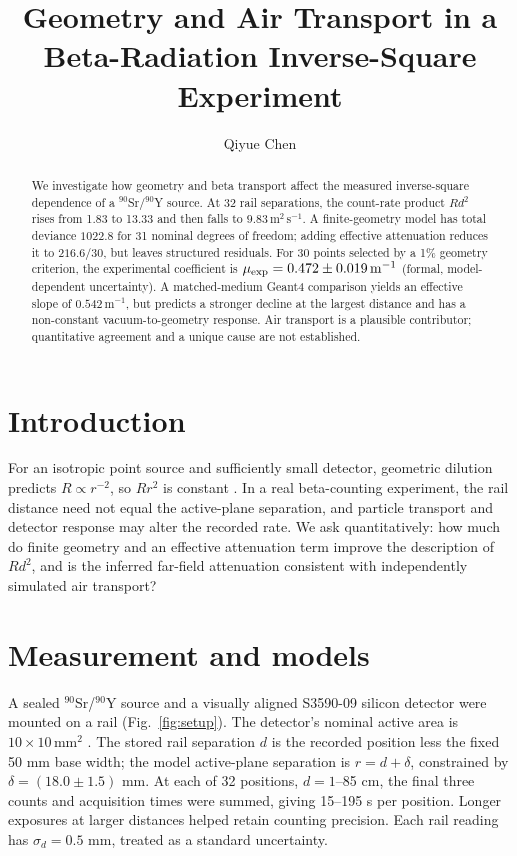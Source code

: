 \documentclass[journal,a4paper]{Imperial_lab_report}
\begin{document}
\title{Geometry and Air Transport in a Beta-Radiation Inverse-Square Experiment}
\author{Qiyue Chen}
\maketitle
\begin{abstract}
We investigate how geometry and beta transport affect the measured inverse-square dependence of a $^{90}$Sr/$^{90}$Y source. At 32 rail separations, the count-rate product $Rd^2$ rises from 1.83 to 13.33 and then falls to $9.83\,\mathrm{m^2\,s^{-1}}$. A finite-geometry model has total deviance $1022.8$ for 31 nominal degrees of freedom; adding effective attenuation reduces it to $216.6/30$, but leaves structured residuals. For 30 points selected by a 1\% geometry criterion, the experimental coefficient is $\mu_{\rm exp}=0.472\pm0.019\,\mathrm{m^{-1}}$ (formal, model-dependent uncertainty). A matched-medium Geant4 comparison yields an effective slope of $0.542\,\mathrm{m^{-1}}$, but predicts a stronger decline at the largest distance and has a non-constant vacuum-to-geometry response. Air transport is a plausible contributor; quantitative agreement and a unique cause are not established.
\end{abstract}

\section{Introduction}
For an isotropic point source and sufficiently small detector, geometric dilution predicts $R\propto r^{-2}$, so $Rr^2$ is constant \cite{script}. In a real beta-counting experiment, the rail distance need not equal the active-plane separation, and particle transport and detector response may alter the recorded rate. We ask quantitatively: how much do finite geometry and an effective attenuation term improve the description of $Rd^2$, and is the inferred far-field attenuation consistent with independently simulated air transport?

\section{Measurement and models}
A sealed $^{90}$Sr/$^{90}$Y source and a visually aligned S3590-09 silicon detector were mounted on a rail (Fig.~\ref{fig:setup}). The detector's nominal active area is $10\times10\,\mathrm{mm^2}$ \cite{sensor}. The stored rail separation $d$ is the recorded position less the fixed 50 mm base width; the model active-plane separation is $r=d+\delta$, constrained by $\delta=(18.0\pm1.5)$ mm. At each of 32 positions, $d=1$--85 cm, the final three counts and acquisition times were summed, giving 15--195 s per position. Longer exposures at larger distances helped retain counting precision. Each rail reading has $\sigma_d=0.5$ mm, treated as a standard uncertainty.
\end{document}
